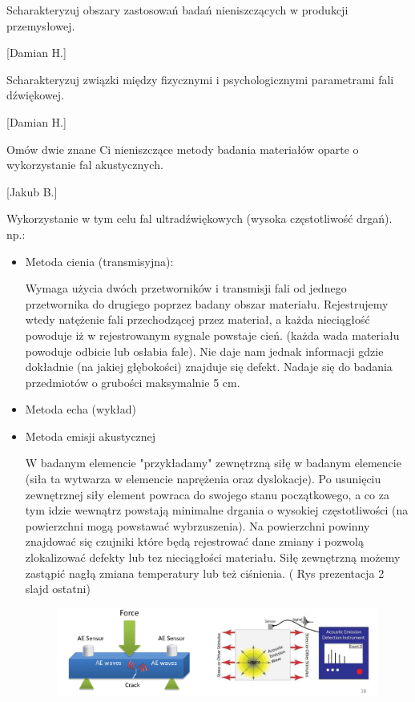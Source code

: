 \documentclass{article}
\begin{document}
\begin{enumerate}
{\Large \bf  \item Scharakteryzuj obszary zastosowań badań nieniszczących w produkcji
przemysłowej.} [Damian H.]

{\Large \bf  \item Scharakteryzuj związki między fizycznymi i psychologicznymi parametrami fali
dźwiękowej.} [Damian H.]

{\Large \bf  \item Omów dwie znane Ci nieniszczące metody badania materiałów oparte o
wykorzystanie fal akustycznych.} [Jakub B.]

 

Wykorzystanie w tym celu fal ultradźwiękowych (wysoka częstotliwość drgań).
np.:

\begin{itemize}
\item Metoda cienia (transmisyjna):

Wymaga użycia dwóch przetworników i transmisji fali od jednego przetwornika do drugiego poprzez badany obszar materiału. Rejestrujemy wtedy natężenie fali przechodzącej przez materiał, a każda nieciągłość powoduje iż w rejestrowanym sygnale powstaje cień. (każda wada materiału powoduje odbicie lub osłabia fale). Nie daje nam jednak informacji gdzie dokładnie (na jakiej głębokości) znajduje się defekt. Nadaje się do badania przedmiotów o grubości maksymalnie 5 cm. 

\item Metoda echa (wykład)


\item Metoda emisji akustycznej 

W badanym elemencie "przykładamy"  zewnętrzną siłę w badanym elemencie (siła ta wytwarza w elemencie naprężenia oraz dyslokacje). Po usunięciu zewnętrznej siły element powraca do swojego stanu początkowego, a co za tym idzie wewnątrz powstają minimalne drgania o wysokiej częstotliwości (na powierzchni mogą powstawać wybrzuszenia). Na powierzchni powinny znajdować się czujniki które będą rejestrować dane zmiany i pozwolą zlokalizować  defekty lub tez nieciągłości materiału. Siłę  zewnętrzną możemy zastąpić nagłą zmiana temperatury lub też ciśnienia. 
( Rys prezentacja 2 slajd ostatni)

\begin{figure}[h!]
\includegraphics[width=\textwidth]{include/faleakust}
\end{figure}


\end{itemize}
\end{enumerate}
\end{document}
